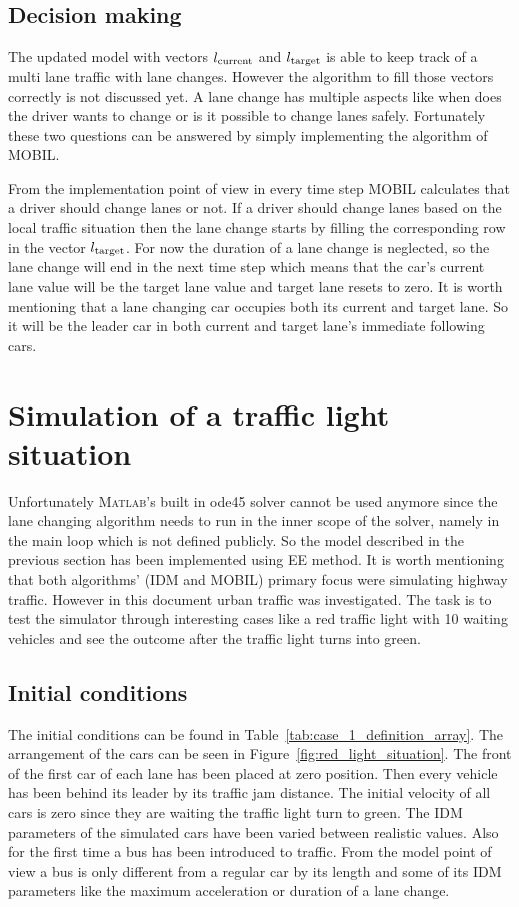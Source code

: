 		\subsection*{Decision making}
		The updated model with vectors $l_{\rm current}$ and $l_{\rm target}$ is able to keep track of a multi lane traffic with lane changes. However the algorithm to fill those vectors correctly is not discussed yet. A lane change has multiple aspects like when does the driver wants to change or is it possible to change lanes safely. Fortunately these two questions can be answered by simply implementing the algorithm of MOBIL.

		From the implementation point of view in every time step MOBIL calculates that a driver should change lanes or not. If a driver should change lanes based on the local traffic situation then the lane change starts by filling the corresponding row in the vector $l_{\rm target}$. For now the duration of a lane change is neglected, so the lane change will end in the next time step which means that the car's current lane value will be the target lane value and target lane resets to zero. It is worth mentioning that a lane changing car occupies both its current and target lane. So it will be the leader car in both current and target lane's immediate following cars.
	\section{Simulation of a traffic light situation}
		Unfortunately \textsc{Matlab}'s built in ode45 solver cannot be used anymore since the lane changing algorithm needs to run in the inner scope of the solver, namely in the main loop which is not defined publicly. So the model described in the previous section has been implemented using EE method.  It is worth mentioning that both algorithms' (IDM and MOBIL) primary focus were simulating highway traffic. However in this document urban traffic was investigated. The task is to test the simulator through interesting cases like a red traffic light with 10 waiting vehicles and see the outcome after the traffic light turns into green.
		
		\subsection*{Initial conditions}
		The initial conditions can be found in Table~\ref{tab:case_1_definition_array}. The arrangement of the cars can be seen in Figure~\ref{fig:red_light_situation}. The front of the first car of each lane has been placed at zero position. Then every vehicle has been behind its leader by its traffic jam distance. The initial velocity of all cars is zero since they are waiting the traffic light turn to green. The IDM parameters of the simulated cars have been varied between realistic values. Also for the first time a bus has been introduced to traffic. From the model point of view a bus is only different from a regular car by its length and some of its IDM parameters like the maximum acceleration or duration of a lane change.
		
